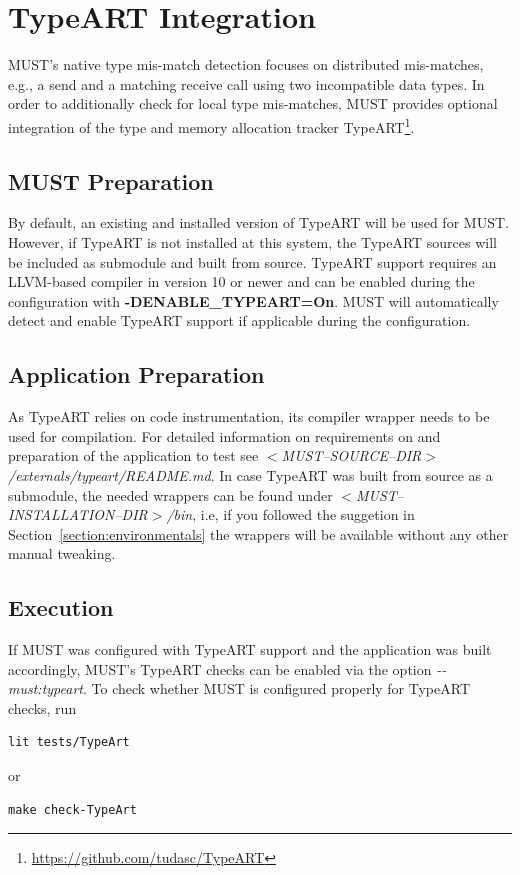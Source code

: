 \documentclass[english]{scrartcl}
\begin{document}
\section{TypeART Integration}
\label{section:typeart}
MUST's native type mis-match detection focuses on distributed mis-matches, e.g., a send and a matching receive call using two incompatible data types. 
In order to additionally check for local type mis-matches, MUST provides optional integration of the type and memory allocation tracker TypeART\footnote{\url{https://github.com/tudasc/TypeART}}.

\subsection{MUST Preparation}
By default, an existing and installed version of TypeART will be used for MUST.
However, if TypeART is not installed at this system, the TypeART sources will be included as submodule and built from source.
TypeART support requires an LLVM-based compiler in version 10 or newer and can be enabled during the configuration with \textbf{\mbox{-DENABLE\_TYPEART=On}}.
MUST will automatically detect and enable TypeART support if applicable during the configuration.

\subsection{Application Preparation}
As TypeART relies on code instrumentation, its compiler wrapper needs to be used for compilation.
For detailed information on requirements on and preparation of the application to test see \emph{$<$MUST\mbox{--}SOURCE\mbox{--}DIR$>$/externals/typeart/README.md}.
In case TypeART was built from source as a submodule, the needed wrappers can be found under \emph{$<$MUST\mbox{--}INSTALLATION\mbox{--}DIR$>$/bin}, i.e,
if you followed the suggetion in Section~\ref{section:environmentals} the wrappers will be available without any other manual tweaking.

\subsection{Execution}
If MUST was configured with TypeART support and the application was built accordingly, MUST's TypeART checks can be enabled via the option \emph{\mbox{-{}-must:typeart}}.
To check whether MUST is configured properly for TypeART checks, run
\begin{verbatim}
lit tests/TypeArt
\end{verbatim}
or
\begin{verbatim}
make check-TypeArt
\end{verbatim}
\end{document}
